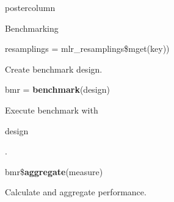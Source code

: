 \documentclass{beamer}
\newcommand{\codeinline}[1]{\begin{codeboxinline}#1\end{codeboxinline}}
\begin{document}
\begin{frame}[fragile]{}
\begin{columns}
\begin{column}{.245\textwidth}
\begin{beamercolorbox}[center]{postercolumn}
\begin{minipage}{.98\textwidth}
{\begin{myblock}{Benchmarking}
\begin{codeboxmultiline}[width=21.95cm]
								\hspace*{1ex}resamplings = mlr\_resamplings\$mget(key))
							\end{codeboxmultiline}
							Create benchmark design.
							\\
							\begin{codebox}
								bmr = \textbf{benchmark}(design)
							\end{codebox}
							Execute benchmark with \codeinline{design}.
							\\
							\begin{codebox}
								bmr\$\textbf{aggregate}(measure)
							\end{codebox}
							Calculate and aggregate performance.
						\end{myblock}\vfill
					}
				\end{minipage}
			\end{beamercolorbox}
		\end{column}
	\end{columns}
\end{frame}
\end{document}
